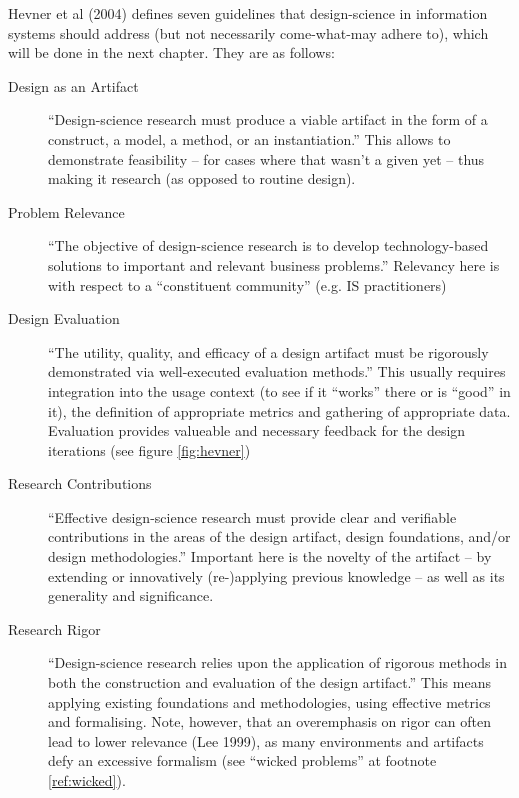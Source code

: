 Hevner et al (2004) defines seven guidelines that design-science in information systems should address (but not necessarily come-what-may adhere to), which will be done in the next chapter. %
They are as follows:


\begin{description}

\item[Design as an Artifact]
``Design-science research must produce a viable artifact in the form of a construct, a model, a method, or an instantiation.'' This allows to demonstrate feasibility -- for cases where that wasn't a given yet -- thus making it research (as opposed to routine design).


\item[Problem Relevance]
``The objective of design-science research is to develop technology-based solutions to important and relevant business problems.'' Relevancy here is with respect to a  ``constituent community'' (e.g. IS practitioners)

\item[Design Evaluation]
``The utility, quality, and efficacy of a design artifact must be rigorously demonstrated via well-executed evaluation methods.'' This usually requires integration into the usage context (to see if it ``works'' there or is ``good'' in it), the definition of appropriate metrics and gathering of appropriate data. Evaluation provides valueable and necessary feedback for the design iterations (see figure \ref{fig:hevner})

\item[Research Contributions]
``Effective design-science research must provide clear and verifiable contributions in the areas of the design artifact, design foundations, and/or design methodologies.'' Important here is the novelty of the artifact -- by extending or innovatively (re-)applying previous knowledge -- as well as its generality and significance.

\item[Research Rigor]
``Design-science research relies upon the application of rigorous methods in both the construction and evaluation of the design artifact.'' This means applying existing foundations and methodologies, using effective metrics and formalising. Note, however, that an overemphasis on rigor can often lead to lower relevance (Lee 1999), as many environments and artifacts defy an excessive formalism (see ``wicked problems'' at footnote \ref{ref:wicked}). %


\end{description}
